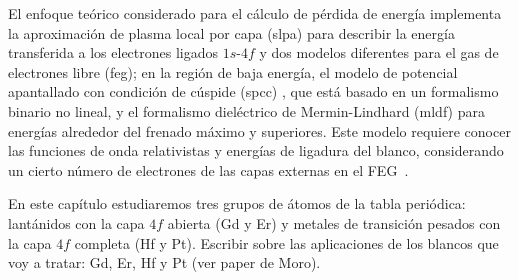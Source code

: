 El enfoque teórico considerado para el cálculo de pérdida de energía 
implementa la aproximación de plasma local por capa (\acs{slpa}) 
\cite{Montanari:13} para describir la energía transferida a los 
electrones ligados $1s$-$4f$ y dos modelos diferentes para el gas de 
electrones libre (\acs{feg}); en la región de baja energía, el modelo 
de potencial apantallado con condición de cúspide (\acs{spcc}) 
\cite{Montanari:17}, que está basado en un formalismo binario no lineal, 
y el formalismo dieléctrico de Mermin-Lindhard (\acs{mldf}) 
\cite{Mermin:70} para energías alrededor del frenado máximo y 
superiores. Este modelo requiere conocer las funciones de onda 
relativistas y energías de ligadura del blanco, considerando un cierto 
número de electrones de las capas externas en el FEG~\cite{Mendez:19relat}. 

En este capítulo estudiaremos tres grupos de átomos de la tabla 
periódica: lantánidos con la capa $4f$ abierta (Gd y Er) y metales de 
transición pesados con la capa $4f$ completa (Hf y Pt). 
{\color{red} Escribir sobre las aplicaciones de los blancos que voy a 
tratar: Gd, Er, Hf y Pt  (ver paper de Moro).}


